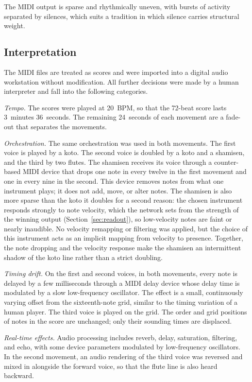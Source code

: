 \documentclass[conference]{IEEEtran}
\begin{document}
The MIDI output is sparse and rhythmically uneven, with bursts of activity separated by silences, which suits a tradition in which silence carries structural weight.

\subsection{Interpretation}

The MIDI files are treated as scores and were imported into a digital audio workstation without modification. All further decisions were made by a human interpreter and fall into the following categories.

\emph{Tempo.} The scores were played at 20~BPM, so that the 72-beat score lasts 3~minutes 36~seconds. The remaining 24~seconds of each movement are a fade-out that separates the movements.

\emph{Orchestration.} The same orchestration was used in both movements. The first voice is played by a koto. The second voice is doubled by a koto and a shamisen, and the third by two flutes. The shamisen receives its voice through a counter-based MIDI device that drops one note in every twelve in the first movement and one in every nine in the second. This device removes notes from what one instrument plays; it does not add, move, or alter notes. The shamisen is also more sparse than the koto it doubles for a second reason: the chosen instrument responds strongly to note velocity, which the network sets from the strength of the winning output (Section~\ref{sec:readout}), so low-velocity notes are faint or nearly inaudible. No velocity remapping or filtering was applied, but the choice of this instrument acts as an implicit mapping from velocity to presence. Together, the note dropping and the velocity response make the shamisen an intermittent shadow of the koto line rather than a strict doubling.

\emph{Timing drift.} On the first and second voices, in both movements, every note is delayed by a few milliseconds through a MIDI delay device whose delay time is modulated by a slow low-frequency oscillator. The effect is a small, continuously varying offset from the sixteenth-note grid, similar to the timing variation of a human player. The third voice is played on the grid. The order and grid positions of notes in the score are unchanged; only their sounding times are displaced.

\emph{Real-time effects.} Audio processing includes reverb, delay, saturation, filtering, and echo, with some device parameters modulated by low-frequency oscillators. In the second movement, an audio rendering of the third voice was reversed and mixed in alongside the forward voice, so that the flute line is also heard backward.
\end{document}
